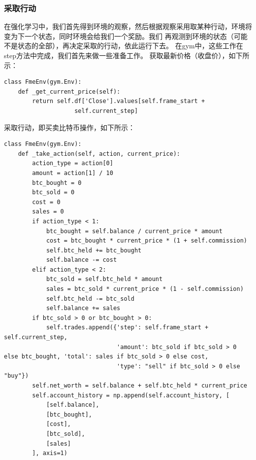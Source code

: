 \documentclass{article}
\begin{document}
\subsubsection{采取行动}
在强化学习中，我们首先得到环境的观察，然后根据观察采用取某种行动，环境将变为下一个状态，同时环境会给我们一个奖励。我们
再观测到环境的状态（可能不是状态的全部），再决定采取的行动，依此运行下去。\newline
在gym中，这些工作在step方法中完成，我们首先来做一些准备工作。
获取最新价格（收盘价），如下所示：
\begin{lstlisting}
class FmeEnv(gym.Env):
    def _get_current_price(self):
        return self.df['Close'].values[self.frame_start + 
                    self.current_step]
\end{lstlisting}
采取行动，即买卖比特币操作，如下所示：
\begin{lstlisting}
class FmeEnv(gym.Env):    
    def _take_action(self, action, current_price):
        action_type = action[0]
        amount = action[1] / 10
        btc_bought = 0
        btc_sold = 0
        cost = 0
        sales = 0
        if action_type < 1:
            btc_bought = self.balance / current_price * amount
            cost = btc_bought * current_price * (1 + self.commission)
            self.btc_held += btc_bought
            self.balance -= cost
        elif action_type < 2:
            btc_sold = self.btc_held * amount
            sales = btc_sold * current_price * (1 - self.commission)
            self.btc_held -= btc_sold
            self.balance += sales
        if btc_sold > 0 or btc_bought > 0:
            self.trades.append({'step': self.frame_start + self.current_step,
                                'amount': btc_sold if btc_sold > 0 else btc_bought, 'total': sales if btc_sold > 0 else cost,
                                'type': "sell" if btc_sold > 0 else "buy"})
        self.net_worth = self.balance + self.btc_held * current_price
        self.account_history = np.append(self.account_history, [
            [self.balance],
            [btc_bought],
            [cost],
            [btc_sold],
            [sales]
        ], axis=1)
\end{lstlisting}
\end{document}
